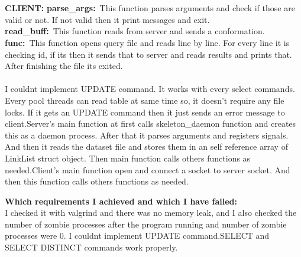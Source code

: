 \documentclass[a4 paper]{article}
\begin{document}
\newline\\
\newline\\
\textbf{{\large CLIENT:}}\newline
\newline
\textbf{parse\_args:}\newline\
\phantom{beta}This function parses arguments and check if those are valid or not. If not valid then it print messages and exit.
\newline\\
\textbf{read\_buff:}\newline\
\phantom{beta}This function reads from server and sends a conformation.
\newline\\
\textbf{func:}\newline\
\phantom{beta}This function opens query file and reads line by line. For every line it is checking id, if its then it sends that to server and reads results and prints that. After finishing the file its exited.\newline\\
\newline\\

I couldnt implement UPDATE command. It works with every select commands. Every pool threads can read table at same time so, it doesn’t require any file locks. If it gets an UPDATE command then it just sends an error message to client.Server’s main function at first calls skeleton\_daemon function and creates this as a daemon process. After that it parses arguments and registers signals. And then it reads the dataset file and stores them in an self reference array of LinkList struct object. Then main function calls others functions as needed.Client’s main function open and connect a socket to server socket. And then this function calls others functions as needed.
\newline

{\color{red}\large\textbf {Which requirements I achieved and which I have failed:}}\newline\\
\phantom{beta}I checked it with valgrind and there was no memory leak, and I also checked the number of zombie processes after the program running and number of zombie processes were 0. I couldnt implement UPDATE command.SELECT and SELECT DISTINCT commands work properly.
\end{document}
